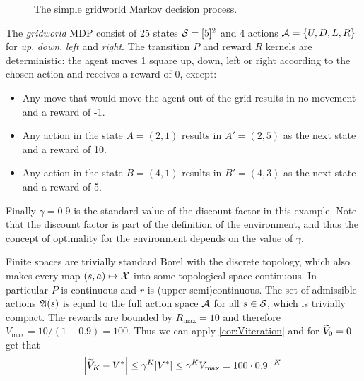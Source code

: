 \begin{example}[Gridworld]
  \begin{figure}[h]
    \centering
    \caption{The simple gridworld Markov decision process.}
  \end{figure}
  The \emph{gridworld} MDP consist of 25 states $\mathcal{S} = [5]^2$ and 4 actions
  $\mathcal{A} = \{U, D, L, R\}$ for \emph{up}, \emph{down}, \emph{left} and 
  \emph{right}. The transition $P$ and reward $R$ kernels are deterministic:
  the agent moves 1 square up, down, left or right according to the chosen
  action and receives a reward of 0, except:
  \begin{itemize}
    \item Any move that would move the
      agent out of the grid results in no movement and a reward of -1.
    \item Any action in the state $A = (2,1)$ results in $A' = (2,5)$ as
      the next state and a reward of 10.
    \item Any action in the state $B = (4,1)$ results in $B' = (4,3)$ as
      the next state and a reward of 5.
  \end{itemize}
  Finally $\gamma = 0.9$ is the standard value of the discount factor
  in this example.
  Note that the discount factor is part of the definition of the environment,
  and thus the concept of optimality for the environment depends on the
  value of $\gamma$.

  Finite spaces are trivially standard Borel with the discrete topology,
  which also makes every map $(s, a) \mapsto \mathcal{X}$ into some
  topological space continuous. In particular $P$ is continuous and
  $r$ is (upper semi)continuous.
  The set of admissible actions $\frak{A}(s)$ is equal to the
  full action space $\mathcal{A}$ for all $s \in \mathcal{S}$, which is trivially
  compact.
  The rewards are bounded by $R_{\max} = 10$
  and therefore $V_{\max} = 10/(1-0.9) = 100$.
  Thus we can apply \cref{cor:Viteration} and for $\widetilde{V}_0 = 0$ get that
  \[ \abs{\widetilde{V}_K - V^*} \leq \gamma^K \abs{V^*}
  \leq \gamma^K V_{\max} = 100 \cdot 0.9^{-K} \]
  

\end{example}
